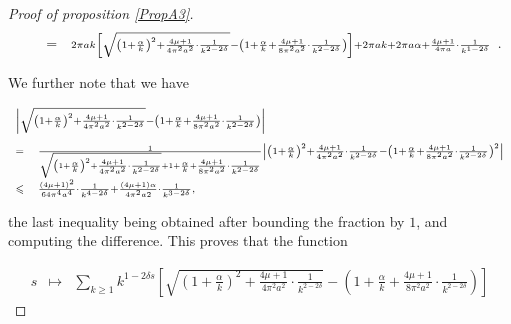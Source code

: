 \documentclass{jams-l}
\theoremstyle{definition}
\theoremstyle{remark}
\numberwithin{equation}{section}
\begin{document}
\begin{proof}[Proof of proposition \ref{PropA3}]
\[\begin{array}{lllll}
                        \quad & = & \multicolumn{3}{l}{\scriptstyle 2 \pi a k \left[ \sqrt{ \left( 1 + \frac{\alpha}{k} \right)^2 + \frac{4 \mu + 1}{4 \pi^2 a^2} \cdot \frac{1}{k^{2-2\delta}}} - \left( 1 + \frac{\alpha}{k} + \frac{4 \mu + 1}{8 \pi^2 a^2} \cdot \frac{1}{k^{2-2\delta}} \right) \right] + 2 \pi a k + 2 \pi a \alpha + \frac{4 \mu + 1}{4 \pi a} \cdot \frac{1}{k^{1-2\delta}}}.
                    \end{array} \]
                
                \noindent We further note that we have
                
                \[ \begin{array}{ll}
                        \multicolumn{2}{l}{\scriptstyle \left \vert \sqrt{ \left( 1 + \frac{\alpha}{k} \right)^2 + \frac{4 \mu + 1}{4 \pi^2 a^2} \cdot \frac{1}{k^{2-2\delta}}} - \left( 1 + \frac{\alpha}{k} + \frac{4 \mu + 1}{8 \pi^2 a^2} \cdot \frac{1}{k^{2-2\delta}} \right) \right \vert} \\[1em]
                        
                        \scriptstyle = & \scriptstyle \frac{1}{\sqrt{ \left( 1 + \frac{\alpha}{k} \right)^2 + \frac{4 \mu + 1}{4 \pi^2 a^2} \cdot \frac{1}{k^{2-2\delta}}} + 1 + \frac{\alpha}{k} + \frac{4 \mu + 1}{8 \pi^2 a^2} \cdot \frac{1}{k^{2-2\delta}}} \left \vert \left( 1 + \frac{\alpha}{k} \right)^2 + \frac{4 \mu + 1}{4 \pi^2 a^2} \cdot \frac{1}{k^{2-2\delta}} - \left( 1 + \frac{\alpha}{k} + \frac{4 \mu + 1}{8 \pi^2 a^2} \cdot \frac{1}{k^{2-2\delta}} \right)^2 \right \vert \\[1.5em]
                        
                        \scriptstyle \leqslant & \scriptstyle \frac{\left( 4 \mu + 1 \right)^2}{64 \pi^4 a^4} \cdot \frac{1}{k^{4-2 \delta}} + \frac{\left( 4 \mu + 1 \right) \alpha}{4 \pi^2 a2} \cdot \frac{1}{k^{3 - 2 \delta}},
                    \end{array} \]
                
                \noindent the last inequality being obtained after bounding the fraction by $1$, and computing the difference. This proves that the function
                
                \[ \begin{array}{lll}
                        s &\longmapsto & \sum\limits_{k \geqslant 1} k^{1 - 2 \delta s} \left[ \sqrt{ \left( 1 + \frac{\alpha}{k} \right)^2 + \frac{4 \mu + 1}{4 \pi^2 a^2} \cdot \frac{1}{k^{2-2\delta}}} - \left( 1 + \frac{\alpha}{k} + \frac{4 \mu + 1}{8 \pi^2 a^2} \cdot \frac{1}{k^{2-2\delta}} \right) \right]
                    \end{array} \]
                

\end{proof}
\end{document}
